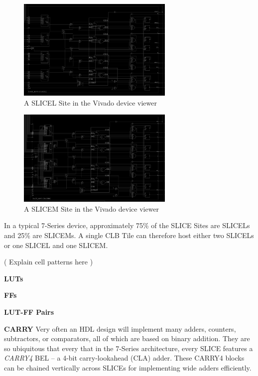 \documentclass[twocolumn]{article}
\begin{document}
    \begin{figure}[h]
        \centering
        \includegraphics[width=7.5cm]{figures/slicel.png}
        \caption{A SLICEL Site in the Vivado device viewer}
        \label{fig:slicel}
    \end{figure}

    \begin{figure}[h]
        \centering
        \includegraphics[width=7.5cm]{figures/slicem.png}
        \caption{A SLICEM Site in the Vivado device viewer}
        \label{fig:slicem}
    \end{figure}

    In a typical 7-Series device, approximately 75\% of the SLICE Sites are SLICELs and 25\% are SLICEMs. 
    A single CLB Tile can therefore host either two SLICELs or one SLICEL and one SLICEM.

    ( Explain cell patterns here )

    \textbf{LUTs} \quad

    \textbf{FFs} \quad

    \textbf{LUT-FF Pairs} \quad

    \textbf{CARRY} \quad
        Very often an HDL design will implement many adders, counters, subtractors, or comparators, all of which are based on binary addition. 
        They are so ubiquitous that every that in the 7-Series architecture, every SLICE features a \emph{CARRY4} BEL -- a 4-bit carry-lookahead (CLA) adder. 
        These CARRY4 blocks can be chained vertically across SLICEs for implementing wide adders efficiently. 
\end{document}
